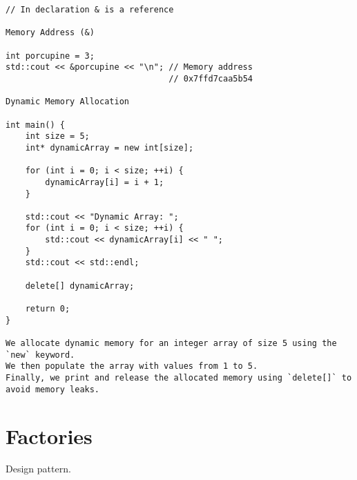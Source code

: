 \begin{verbatim}
// In declaration & is a reference

Memory Address (&)

int porcupine = 3;
std::cout << &porcupine << "\n"; // Memory address
                                 // 0x7ffd7caa5b54

Dynamic Memory Allocation

int main() {
    int size = 5;
    int* dynamicArray = new int[size];

    for (int i = 0; i < size; ++i) {
        dynamicArray[i] = i + 1;
    }

    std::cout << "Dynamic Array: ";
    for (int i = 0; i < size; ++i) {
        std::cout << dynamicArray[i] << " ";
    }
    std::cout << std::endl;

    delete[] dynamicArray;

    return 0;
}

We allocate dynamic memory for an integer array of size 5 using the `new` keyword.
We then populate the array with values from 1 to 5.
Finally, we print and release the allocated memory using `delete[]` to avoid memory leaks.
\end{verbatim}

\section{Factories}

Design pattern.

